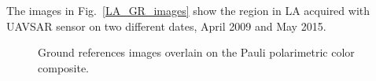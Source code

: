 \documentclass[remotesensing,article,submit,pdftex,moreauthors]{Definitions/mdpi}
\begin{document}
The images in Fig.~\eqref{LA_GR_images} show the region in LA acquired with UAVSAR sensor on two different dates, April 2009 and May 2015.
\begin{figure}[ht!]
    \centering
    \caption{Ground references images overlain on the Pauli polarimetric color composite.}
     \label{LA_GR_images} 
\end{figure}
\end{document}
